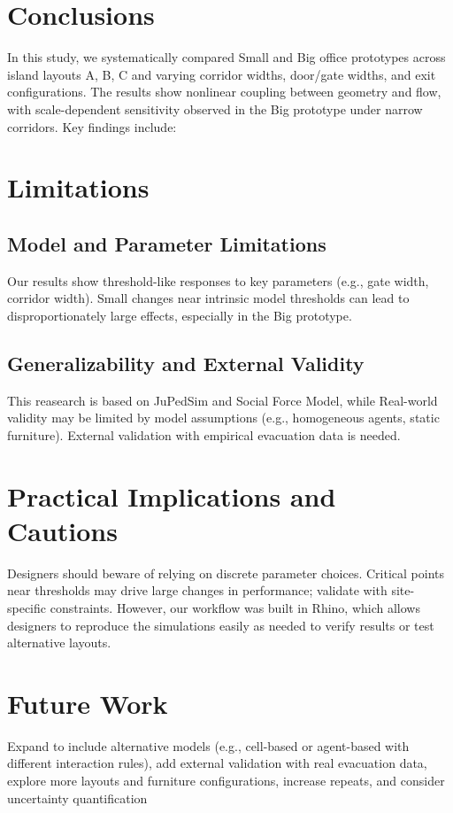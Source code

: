 \section{Conclusions}
In this study, we systematically compared Small and Big office prototypes across island layouts A, B, C and varying corridor widths, door/gate widths, and exit configurations. The results show nonlinear coupling between geometry and flow, with scale-dependent sensitivity observed in the Big prototype under narrow corridors. Key findings include:
\section{Limitations}

\subsection{Model and Parameter Limitations}

Our results show threshold-like responses to key parameters (e.g., gate width, corridor width). Small changes near intrinsic model thresholds can lead to disproportionately large effects, especially in the Big prototype.

\subsection{Generalizability and External Validity}

This reasearch is based on JuPedSim and Social Force Model, while Real-world validity may be limited by model assumptions (e.g., homogeneous agents, static furniture). External validation with empirical evacuation data is needed.
\section{Practical Implications and Cautions}

Designers should beware of relying on discrete parameter choices. Critical points near thresholds may drive large changes in performance; validate with site-specific constraints. However, our workflow was built in Rhino, which allows designers to reproduce the simulations easily as needed to verify results or test alternative layouts.

\section{Future Work}
Expand to include alternative models (e.g., cell-based or agent-based with different interaction rules), add external validation with real evacuation data, explore more layouts and furniture configurations, increase repeats, and consider uncertainty quantification